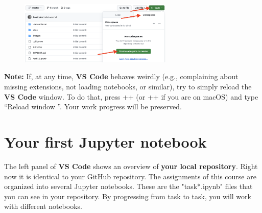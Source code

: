 \documentclass[12pt,a4paper]{article}
\begin{document}
\vspace{-1em}
\begin{figure}[h!]
    \centering
    \includegraphics[width=0.65\textwidth]{images/codespaces.png}
\end{figure}

\textbf{Note:} If, at any time, \textbf{VS Code} behaves weirdly (e.g., complaining about missing extensions, not loading notebooks, or similar), try to simply reload the \textbf{VS Code} window. To do that, press \Ctrl+\keystroke{\shift}+ (or \keystroke{\cmd}+\keystroke{\shift}+ if you are on macOS) and type ``Reload window \Return''. Your work progress will be preserved.

\section{Your first Jupyter notebook}
The left panel of \textbf{VS Code} shows an overview of \textbf{your local repository}. Right now it is identical to your GitHub repository. The assignments of this course are organized into several Jupyter notebooks. These are the "task*.ipynb" files that you can see in your repository. By progressing from task to task, you will work with different notebooks.
\end{document}
